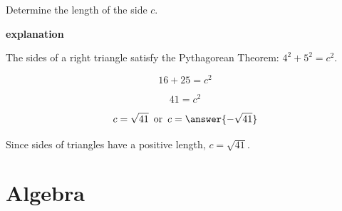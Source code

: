 \documentclass{ximera}
\begin{document}
\begin{example}


Determine the length of the side $c$. 






\begin{image}[3in]
  \end{image}



\textbf{\textcolor{red!75!green}{explanation}} 

The sides of a right triangle satisfy the Pythagorean Theorem: $4^2 + 5^2 = c^2$.


\[  16 + 25 = c^2       \]

\[  41 = c^2     \]

\[  c = \sqrt{41} \, \text{ or } \, c = \answer{-\sqrt{41}}    \]



Since sides of triangles have a positive length, $c = \sqrt{41}$.








\end{example}






















\section*{Algebra}
\end{document}
